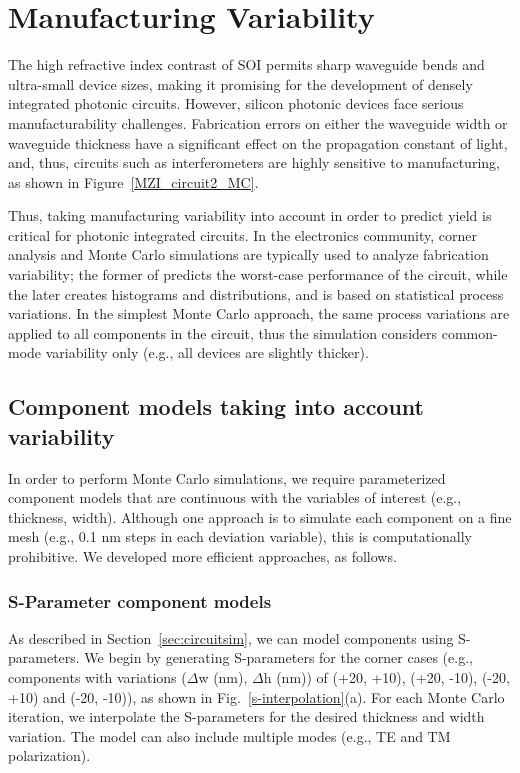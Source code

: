 \documentclass[journal]{spie}
\begin{document}
\section{Manufacturing Variability}
\label{sec:variability}
The high refractive index contrast of SOI permits sharp waveguide bends and ultra-small device sizes, making it promising for the development of densely integrated photonic circuits. However, silicon photonic devices face serious manufacturability challenges. Fabrication errors on either the waveguide width or waveguide thickness have a significant effect on the propagation constant of light, and, thus, circuits such as interferometers are highly sensitive to manufacturing, as shown in Figure~\ref{MZI_circuit2_MC}.

Thus, taking manufacturing variability into account in order to predict yield is critical for photonic integrated circuits. In the electronics community, corner analysis and Monte Carlo simulations are typically used to analyze fabrication variability; the former of predicts the worst-case performance of the circuit, while the later creates histograms and distributions, and is based on statistical process variations.  In the simplest Monte Carlo approach, the same process variations are applied to all components in the circuit, thus the simulation considers common-mode variability only (e.g., all devices are slightly thicker).  

\subsection{Component models taking into account variability}
In order to perform Monte Carlo simulations, we require parameterized component models that are continuous with the variables of interest (e.g., thickness, width).  Although one approach is to simulate each component on a fine mesh (e.g., 0.1 nm steps in each deviation variable), this is computationally prohibitive.  We developed more efficient approaches, as follows.

\subsubsection{S-Parameter component models}
\label{SparamModel}
As described in Section~\ref{sec:circuitsim}, we can model components using S-parameters.  
We begin by generating S-parameters for the corner cases (e.g., components with variations ($\Delta$w (nm), $\Delta$h (nm)) of (+20, +10), (+20, -10), (-20, +10) and (-20, -10)), as shown in Fig.~\ref{s-interpolation}(a).  For each Monte Carlo iteration, we interpolate the S-parameters for the desired thickness and width variation. The model can also include multiple modes (e.g., TE and TM polarization).
\end{document}
